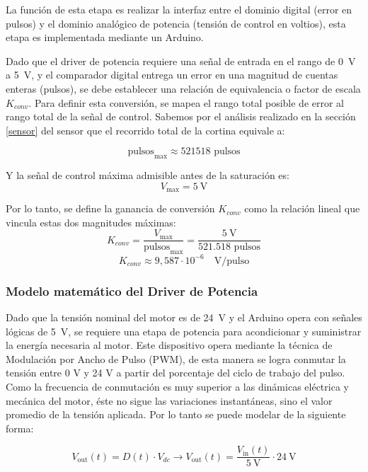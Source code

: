 La función de esta etapa es realizar la interfaz entre el dominio digital (error en pulsos) y el dominio analógico de potencia (tensión de control en voltios), esta etapa es implementada mediante un Arduino.

Dado que el driver de potencia requiere una señal de entrada en el rango de \SI{0}{\volt} a \SI{5}{\volt}, y el comparador digital entrega un error en una magnitud de cuentas enteras (pulsos), se debe establecer una relación de equivalencia o factor de escala $K_{conv}$. Para definir esta conversión, se mapea el rango total posible de error al rango total de la señal de control. Sabemos por el análisis realizado en la sección \ref{sensor} del sensor que el recorrido total de la cortina equivale a:

\[
\text{pulsos}_{\text{max}} \approx 521518 \text{ pulsos}
\]

Y la señal de control máxima admisible antes de la saturación es:
\[
V_{\text{max}} = \SI{5}{\volt}
\]

Por lo tanto, se define la ganancia de conversión $K_{conv}$ como la relación lineal que vincula estas dos magnitudes máximas:
\[
K_{conv} = \frac{V_{\text{max}}}{\text{pulsos}_{\text{max}}} = \frac{\SI{5}{\volt}}{521.518 \text{ pulsos}}
\]
\begin{equation}
	K_{conv} \approx 9,587 \cdot 10^{-6} \quad \text{V/pulso} \label{eq:fdt_conv}
\end{equation}

\subsubsection{Modelo matemático del Driver de Potencia}

Dado que la tensión nominal del motor es de \SI{24}{\volt} y el Arduino opera con señales lógicas de \SI{5}{\volt}, se requiere una etapa de potencia para acondicionar y suministrar la energía necesaria al motor. Este dispositivo opera mediante la técnica de Modulación por Ancho de Pulso (PWM), de esta manera se logra conmutar la tensión entre 0 V y 24 V a partir del porcentaje del ciclo de trabajo del pulso.
Como la frecuencia de conmutación es muy superior a las dinámicas eléctrica y mecánica del motor, éste no sigue las variaciones instantáneas, sino el valor promedio de la tensión aplicada. Por lo tanto se puede modelar de la siguiente forma:

\[
V_{\text{out}}(t) = D(t) \cdot V_{dc} \rightarrow V_{\text{out}}(t) = \frac{V_{\text{in}}(t)}{\SI{5}{\volt}} \cdot \SI{24}{\volt}
\]

